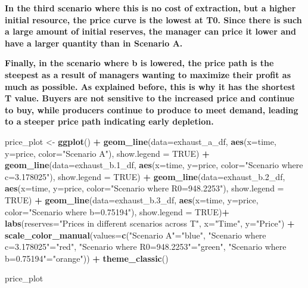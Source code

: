 \documentclass[
]{article}
\newenvironment{Shaded}{\begin{snugshade}}{\end{snugshade}}
\newcommand{\AttributeTok}[1]{\textcolor[rgb]{0.13,0.29,0.53}{#1}}
\newcommand{\ConstantTok}[1]{\textcolor[rgb]{0.56,0.35,0.01}{#1}}
\newcommand{\FloatTok}[1]{\textcolor[rgb]{0.00,0.00,0.81}{#1}}
\newcommand{\FunctionTok}[1]{\textcolor[rgb]{0.13,0.29,0.53}{\textbf{#1}}}
\newcommand{\NormalTok}[1]{#1}
\newcommand{\OtherTok}[1]{\textcolor[rgb]{0.56,0.35,0.01}{#1}}
\newcommand{\SpecialCharTok}[1]{\textcolor[rgb]{0.81,0.36,0.00}{\textbf{#1}}}
\newcommand{\StringTok}[1]{\textcolor[rgb]{0.31,0.60,0.02}{#1}}
\begin{document}
{\textbf{In the third scenario where this is no cost of extraction, but
a higher initial resource, the price curve is the lowest at T0. Since
there is such a large amount of initial reserves, the manager can price
it lower and have a larger quantity than in Scenario A.}}

{\textbf{Finally, in the scenario where b is lowered, the price path is
the steepest as a result of managers wanting to maximize their profit as
much as possible. As explained before, this is why it has the shortest T
value. Buyers are not sensitive to the increased price and continue to
buy, while producers continue to produce to meet demand, leading to a
steeper price path indicating early depletion. }}

\begin{Shaded}
\begin{Highlighting}[]
\NormalTok{price\_plot }\OtherTok{\textless{}{-}} \FunctionTok{ggplot}\NormalTok{() }\SpecialCharTok{+} 
  \FunctionTok{geom\_line}\NormalTok{(}\AttributeTok{data=}\NormalTok{exhaust\_a\_df, }\FunctionTok{aes}\NormalTok{(}\AttributeTok{x=}\NormalTok{time, }\AttributeTok{y=}\NormalTok{price, }\AttributeTok{color=}\StringTok{"Scenario A"}\NormalTok{), }\AttributeTok{show.legend =} \ConstantTok{TRUE}\NormalTok{) }\SpecialCharTok{+}
  \FunctionTok{geom\_line}\NormalTok{(}\AttributeTok{data=}\NormalTok{exhaust\_b}\FloatTok{.1}\NormalTok{\_df, }\FunctionTok{aes}\NormalTok{(}\AttributeTok{x=}\NormalTok{time, }\AttributeTok{y=}\NormalTok{price, }\AttributeTok{color=}\StringTok{"Scenario where c=3.178025"}\NormalTok{), }\AttributeTok{show.legend =} \ConstantTok{TRUE}\NormalTok{) }\SpecialCharTok{+}
  \FunctionTok{geom\_line}\NormalTok{(}\AttributeTok{data=}\NormalTok{exhaust\_b}\FloatTok{.2}\NormalTok{\_df, }\FunctionTok{aes}\NormalTok{(}\AttributeTok{x=}\NormalTok{time, }\AttributeTok{y=}\NormalTok{price, }\AttributeTok{color=}\StringTok{"Scenario where R0=948.2253"}\NormalTok{), }\AttributeTok{show.legend =} \ConstantTok{TRUE}\NormalTok{) }\SpecialCharTok{+}
  \FunctionTok{geom\_line}\NormalTok{(}\AttributeTok{data=}\NormalTok{exhaust\_b}\FloatTok{.3}\NormalTok{\_df, }\FunctionTok{aes}\NormalTok{(}\AttributeTok{x=}\NormalTok{time, }\AttributeTok{y=}\NormalTok{price, }\AttributeTok{color=}\StringTok{"Scenario where b=0.75194"}\NormalTok{), }\AttributeTok{show.legend =} \ConstantTok{TRUE}\NormalTok{)}\SpecialCharTok{+}
  \FunctionTok{labs}\NormalTok{(}\AttributeTok{reserves=}\StringTok{"Prices in different scenarios across T"}\NormalTok{, }\AttributeTok{x=}\StringTok{"Time"}\NormalTok{, }\AttributeTok{y=}\StringTok{"Price"}\NormalTok{) }\SpecialCharTok{+}
  \FunctionTok{scale\_color\_manual}\NormalTok{(}\AttributeTok{values=}\FunctionTok{c}\NormalTok{(}\StringTok{"Scenario A"}\OtherTok{=}\StringTok{"blue"}\NormalTok{, }\StringTok{"Scenario where c=3.178025"}\OtherTok{=}\StringTok{"red"}\NormalTok{, }\StringTok{"Scenario where R0=948.2253"}\OtherTok{=}\StringTok{"green"}\NormalTok{, }\StringTok{"Scenario where b=0.75194"}\OtherTok{=}\StringTok{"orange"}\NormalTok{)) }\SpecialCharTok{+}
  \FunctionTok{theme\_classic}\NormalTok{()}

\NormalTok{price\_plot}
\end{Highlighting}
\end{Shaded}
\end{document}
